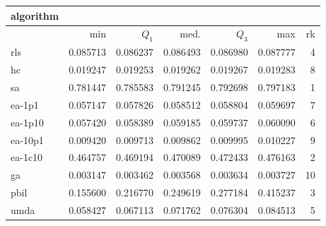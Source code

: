 \begin{tabular}{@{}l*{5}{>{{}}N{1}{3}}>{{}}N{2}{0}@{}}
\toprule
{algorithm} &  \\
\midrule
& {min} & {$Q_1$} & {med.} & {$Q_3$} & {max} & {rk}\\
\midrule
rls & 0.085713 & 0.086237 & 0.086493 & 0.086980 & 0.087777 & 4\\
hc & 0.019247 & 0.019253 & 0.019262 & 0.019267 & 0.019283 & 8\\
sa & {\color{blue}} 0.781447 & {\color{blue}} 0.785583 & {\color{blue}} 0.791245 & {\color{blue}} 0.792698 & {\color{blue}} 0.797183 & 1\\
ea-1p1 & 0.057147 & 0.057826 & 0.058512 & 0.058804 & 0.059697 & 7\\
ea-1p10 & 0.057420 & 0.058389 & 0.059185 & 0.059737 & 0.060090 & 6\\
ea-10p1 & 0.009420 & 0.009713 & 0.009862 & 0.009995 & 0.010227 & 9\\
ea-1c10 & 0.464757 & 0.469194 & 0.470089 & 0.472433 & 0.476163 & 2\\
ga & 0.003147 & 0.003462 & 0.003568 & 0.003634 & 0.003727 & 10\\
pbil & 0.155600 & 0.216770 & 0.249619 & 0.277184 & 0.415237 & 3\\
umda & 0.058427 & 0.067113 & 0.071762 & 0.076304 & 0.084513 & 5\\
\bottomrule
\end{tabular}
